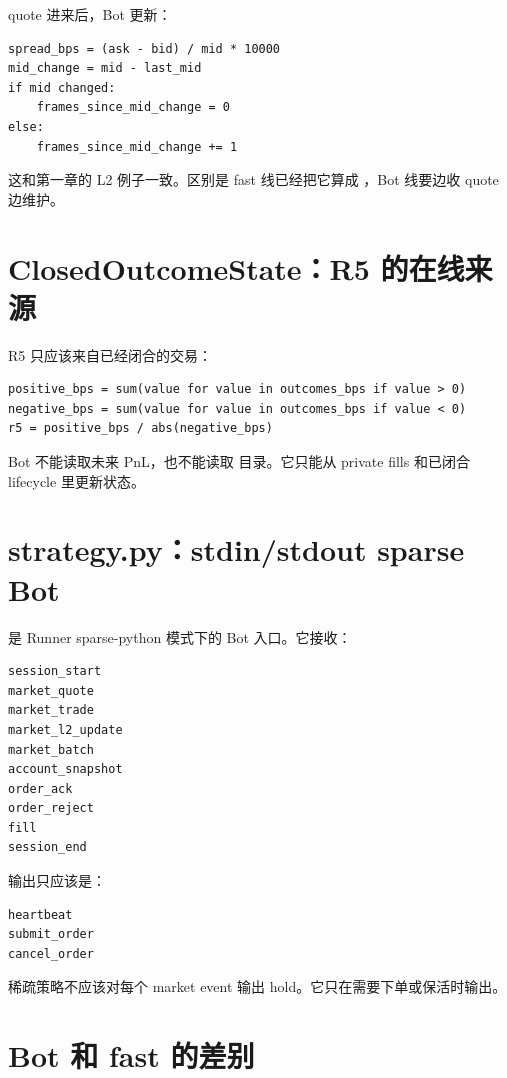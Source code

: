 quote 进来后，Bot 更新：

\begin{lstlisting}
spread_bps = (ask - bid) / mid * 10000
mid_change = mid - last_mid
if mid changed:
    frames_since_mid_change = 0
else:
    frames_since_mid_change += 1
\end{lstlisting}

这和第一章的 L2 例子一致。区别是 fast 线已经把它算成 ，Bot 线要边收 quote 边维护。

\section{ClosedOutcomeState：R5 的在线来源}

R5 只应该来自已经闭合的交易：

\begin{lstlisting}
positive_bps = sum(value for value in outcomes_bps if value > 0)
negative_bps = sum(value for value in outcomes_bps if value < 0)
r5 = positive_bps / abs(negative_bps)
\end{lstlisting}

Bot 不能读取未来 PnL，也不能读取  目录。它只能从 private fills 和已闭合 lifecycle 里更新状态。


\section{strategy.py：stdin/stdout sparse Bot}

 是 Runner sparse-python 模式下的 Bot 入口。它接收：

\begin{lstlisting}
session_start
market_quote
market_trade
market_l2_update
market_batch
account_snapshot
order_ack
order_reject
fill
session_end
\end{lstlisting}

输出只应该是：

\begin{lstlisting}
heartbeat
submit_order
cancel_order
\end{lstlisting}

稀疏策略不应该对每个 market event 输出 hold。它只在需要下单或保活时输出。

\section{Bot 和 fast 的差别}


